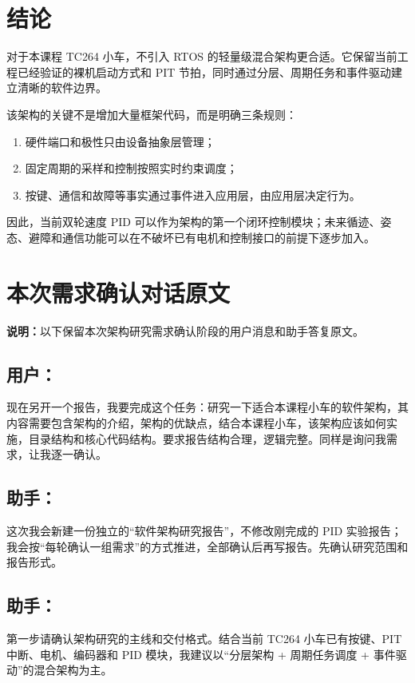 \documentclass[11pt,a4paper,fontset=fandol]{ctexart}
\begin{document}
\section{结论}

对于本课程 TC264 小车，不引入 RTOS 的轻量级混合架构更合适。它保留当前工程已经验证的裸机启动方式和 PIT 节拍，同时通过分层、周期任务和事件驱动建立清晰的软件边界。

该架构的关键不是增加大量框架代码，而是明确三条规则：

\begin{enumerate}
\item 硬件端口和极性只由设备抽象层管理；
\item 固定周期的采样和控制按照实时约束调度；
\item 按键、通信和故障等事实通过事件进入应用层，由应用层决定行为。
\end{enumerate}

因此，当前双轮速度 PID 可以作为架构的第一个闭环控制模块；未来循迹、姿态、避障和通信功能可以在不破坏已有电机和控制接口的前提下逐步加入。

\appendix
\section{本次需求确认对话原文}

\noindent\textbf{说明：}以下保留本次架构研究需求确认阶段的用户消息和助手答复原文。

\subsection*{用户：}
现在另开一个报告，我要完成这个任务：研究一下适合本课程小车的软件架构，其内容需要包含架构的介绍，架构的优缺点，结合本课程小车，该架构应该如何实施，目录结构和核心代码结构。要求报告结构合理，逻辑完整。同样是询问我需求，让我逐一确认。

\subsection*{助手：}
这次我会新建一份独立的“软件架构研究报告”，不修改刚完成的 PID 实验报告；我会按“每轮确认一组需求”的方式推进，全部确认后再写报告。先确认研究范围和报告形式。

\subsection*{助手：}
第一步请确认架构研究的主线和交付格式。结合当前 TC264 小车已有按键、PIT 中断、电机、编码器和 PID 模块，我建议以“分层架构 + 周期任务调度 + 事件驱动”的混合架构为主。
\end{document}
